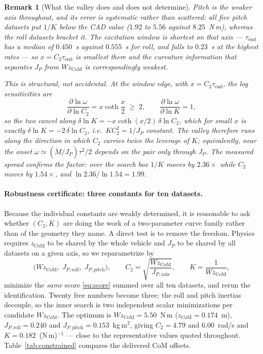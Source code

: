 \documentclass[10pt]{article}
\newtheorem{remark}{Remark}
\begin{document}
\begin{remark}[What the valley does and does not determine]
Pitch is the weaker axis throughout, and its error is systematic rather
than scattered: all five pitch datasets put $1/K$ below the CAD value
($1.92$ to $5.56$ against $8.25$~N\,m), whereas the roll datasets
bracket it. The excitation window is shortest on that axis ---
$\tau_{\mathrm{end}}$ has a median of $0.450$~s against $0.555$~s for
roll, and falls to $0.23$~s at the highest rates --- so
$x = C_2\tau_{\mathrm{end}}$ is smallest there and the curvature
information that separates $J_P$ from $W z_{\mathrm{CoM}}$ is
correspondingly weakest.

This is structural, not accidental. At the window edge, with
$x = C_2\tau_{\mathrm{end}}$, the log sensitivities are
\begin{equation*}
  \frac{\partial\ln\omega}{\partial\ln C_2} = x\coth\frac{x}{2} \;\ge\; 2,
  \qquad
  \frac{\partial\ln\omega}{\partial\ln K} = 1 ,
\end{equation*}
so the two cancel along
$\delta\ln K = -x\coth(x/2)\,\delta\ln C_2$, which for small $x$ is
exactly $\delta\ln K = -2\,\delta\ln C_2$, i.e.\
$K C_2^2 = 1/J_P$ constant. The valley therefore runs along the direction in which
$C_2$ carries twice the leverage of $K$; equivalently, near the onset
$\omega \simeq (\dot M/J_P)\tau^2/2$ depends on the pair only through
$J_P$. The measured spread confirms the factor: over the search box
$1/K$ moves by $2.36\times$ while $C_2$ moves by $1.54\times$, and
$\ln 2.36/\ln 1.54 = 1.99$.
\end{remark}

\paragraph{Robustness certificate: three constants for ten datasets.}
Because the individual constants are weakly determined, it is
reasonable to ask whether $(C_2, K)$ are doing the work of a
two-parameter curve family rather than of the geometry they name. A
direct test is to remove the freedom. Physics requires $z_{\mathrm{CoM}}$ to be shared
by the whole vehicle and $J_P$ to be shared by all datasets on a given
axis, so we reparametrize by
\begin{equation}
  \bigl(W z_{\mathrm{CoM}},\; J_{P,\mathrm{roll}},\;
        J_{P,\mathrm{pitch}}\bigr),
  \qquad
  C_2 = \sqrt{\frac{W z_{\mathrm{CoM}}}{J_{P,\mathrm{axis}}}},
  \qquad
  K = \frac{1}{W z_{\mathrm{CoM}}},
  \label{eq:constrained}
\end{equation}
minimize the \emph{same} score \eqref{eq:score} summed over all ten
datasets, and rerun the identification. Twenty free numbers become
three; the roll and pitch inertias decouple, so the inner search is two
independent scalar minimizations per candidate $W z_{\mathrm{CoM}}$.
The optimum is $W z_{\mathrm{CoM}} = 5.50$~N\,m
($z_{\mathrm{CoM}} = 0.174$~m), $J_{P,\mathrm{roll}} = 0.240$ and
$J_{P,\mathrm{pitch}} = 0.153$~kg\,m$^2$, giving $C_2 = 4.79$ and
$6.00$~rad/s and $K = 0.182$~(N\,m)$^{-1}$ — close to the
representative values quoted throughout. Table~\ref{tab:constrained}
compares the delivered CoM offsets.
\end{document}
